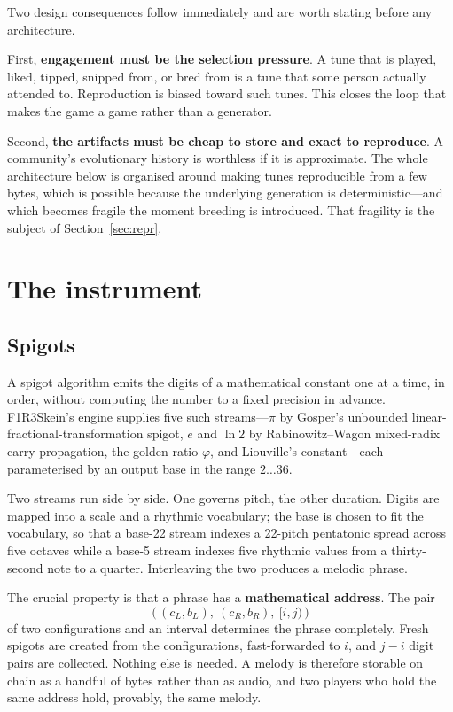 \documentclass[11pt,a4paper]{article}
\theoremstyle{definition}
\theoremstyle{plain}
\begin{document}
Two design consequences follow immediately and are worth stating before any architecture.

First, \textbf{engagement must be the selection pressure}. A tune that is played, liked, tipped,
snipped from, or bred from is a tune that some person actually attended to. Reproduction is biased
toward such tunes. This closes the loop that makes the game a game rather than a generator.

Second, \textbf{the artifacts must be cheap to store and exact to reproduce}. A community's
evolutionary history is worthless if it is approximate. The whole architecture below is organised
around making tunes reproducible from a few bytes, which is possible because the underlying
generation is deterministic---and which becomes fragile the moment breeding is introduced. That
fragility is the subject of Section~\ref{sec:repr}.

\section{The instrument}

\subsection{Spigots}

A spigot algorithm emits the digits of a mathematical constant one at a time, in order, without
computing the number to a fixed precision in advance. F1R3Skein's engine supplies five such
streams---$\pi$ by Gosper's unbounded linear-fractional-transformation spigot, $e$ and $\ln 2$ by
Rabinowitz--Wagon mixed-radix carry propagation, the golden ratio $\varphi$, and Liouville's
constant---each parameterised by an output base in the range $2\ldots36$.

Two streams run side by side. One governs pitch, the other duration. Digits are mapped into a
scale and a rhythmic vocabulary; the base is chosen to fit the vocabulary, so that a base-22 stream
indexes a 22-pitch pentatonic spread across five octaves while a base-5 stream indexes five
rhythmic values from a thirty-second note to a quarter. Interleaving the two produces a melodic
phrase.

The crucial property is that a phrase has a \textbf{mathematical address}. The pair
\[
\big(\,(c_L, b_L),\ (c_R, b_R),\ [i, j)\,\big)
\]
of two configurations and an interval determines the phrase completely. Fresh spigots are created
from the configurations, fast-forwarded to $i$, and $j - i$ digit pairs are collected. Nothing else
is needed. A melody is therefore storable on chain as a handful of bytes rather than as audio, and
two players who hold the same address hold, provably, the same melody.
\end{document}
